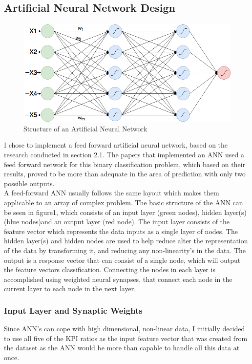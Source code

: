 \documentclass[11pt]{article}
\begin{document}
\subsection{Artificial Neural Network Design}
\begin{figure}[h]
\centering
\includegraphics[scale = .37]{ANN}
\caption{Structure of an Artificial Neural Network} 
\end{figure}
I chose to implement a feed forward artificial neural network, based on the research conducted in section 2.1. The papers that implemented an ANN used a feed forward network for this binary classification problem, which based on their results, proved to be more than adequate in the area of prediction with only two possible outputs.\\
A feed-forward ANN usually follows the same layout which makes them applicable to an array of complex problem. The basic structure of the ANN can be seen in figure1, which consists of an input layer (green nodes), hidden layer(s) (blue nodes)and an output layer (red node). The input layer consists of the feature vector which represents the data inputs as a single layer of nodes. The hidden layer(s) and hidden nodes are used to help reduce alter the representation of the data by transforming it, and reducing any non-linearity's in the data. The output is a response vector that can consist of a single node, which will output the feature vectors classification. Connecting the nodes in each layer is accomplished using weighted neural synapses, that connect each node in the current layer to each node in the next layer. 

\subsubsection{Input Layer and Synaptic Weights}
Since ANN's can cope with high dimensional, non-linear data, I initially decided to use all five of the KPI ratios as the input feature vector that was created from the dataset as the ANN would be more than capable to handle all this data at once.\\
\end{document}
